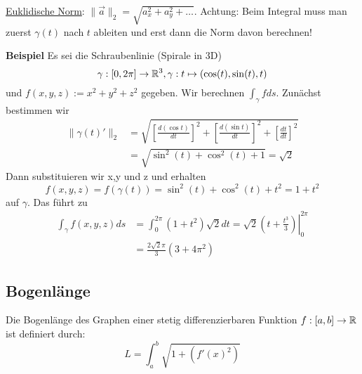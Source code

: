 \underline{Euklidische Norm}: $\|\vec{a}\|_2 = \sqrt{a_x^2 + a_y^2 + \ldots}$.
Achtung: Beim Integral muss man zuerst $\gamma(t)$ nach $t$ ableiten und erst
dann die Norm davon berechnen!

\textbf{Beispiel}
Es sei die Schraubenlinie (Spirale in 3D)
\[
\gamma : [0,2\pi]  \to \mathbb{R}^3, \gamma : t \mapsto  (\cos(t), \sin(t), t) 
\]
und $f(x,y,z) := x^2 + y^2 + z^2$ gegeben. Wir berechnen $\int_\gamma f ds$. Zunächst bestimmen wir
\begin{align*}
\|\gamma(t)'\|_2 &= \sqrt{\left[\frac{d(\cos t)}{dt}\right]^2 +
\left[\frac{d(\sin t)}{dt}\right]^2 + \left[\frac{dt}{dt}\right]^2} \\
&= \sqrt{\sin^2(t)+\cos^2(t)+1}=\sqrt{2}
\end{align*}
Dann substituieren wir x,y und z und erhalten
\[
f(x,y,z) = f(\gamma(t)) = \sin^2(t)+\cos^2(t)+t^2 = 1 +t^2
\]
auf $\gamma$. Das führt zu
\begin{align*}
\int_\gamma f(x,y,z) ds &= \int_0^{2\pi} (1 +t^2)\sqrt{2} dt = \left. \sqrt{2}(t+\frac{t^3}{3}) \right|_0^{2\pi} \\
&= \frac{2\sqrt{2}\pi}{3}(3+4\pi^2)
\end{align*}

\subsection{Bogenlänge}
\begin{definition} Die Bogenlänge des Graphen einer stetig differenzierbaren Funktion $f: [a, b] \to \mathbb{R}$ ist definiert durch:
\[
	L = \int_a^b \sqrt{1 + (f'(x)^2)}
\]
\end{definition}

\pagebreak